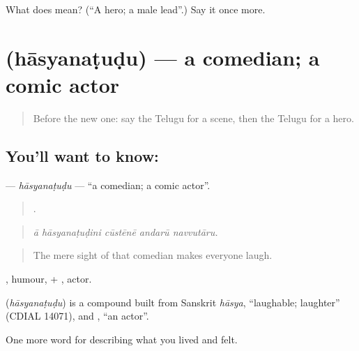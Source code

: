\begin{tcolorbox}[breakable,colback=teal!4,colframe=teal!35!black,title={Before you move on}]
What does  mean? (\textquotedblleft{}A hero; a male lead\textquotedblright{}.) Say it once more.
\end{tcolorbox}
\section[\texorpdfstring{\te{హాస్యనటుడు} (hāsyanaṭuḍu)}{హాస్యనటుడు (hāsyanaṭuḍu)}]{ (hāsyanaṭuḍu) — a comedian; a comic actor}

\label{lesson:TE-C541-hasyanatudu}



\begin{quote}
Before the new one: say the Telugu for a scene, then the Telugu for a hero.
\end{quote}

\subsection*{You'll want to know: }
\textbf{} — \emph{hāsyanaṭuḍu} — \textquotedblleft{}a comedian; a comic actor\textquotedblright{}.

\begin{quote}
    .
\end{quote}

\begin{quote}
\emph{ā hāsyanaṭuḍini cūstēnē andarū navvutāru.}
\end{quote}

\begin{quote}
The mere sight of that comedian makes everyone laugh.
\end{quote}

, humour, + , actor.

\begin{cousinweb}
\textbf{} (\emph{hāsyanaṭuḍu}) is a compound built from Sanskrit \emph{hāsya}, \textquotedblleft{}laughable; laughter\textquotedblright{} (CDIAL 14071), and , \textquotedblleft{}an actor\textquotedblright{}.
\end{cousinweb}

\begin{grammarlens}[title={What you've built}]
One more word for describing what you lived and felt.
\end{grammarlens}

